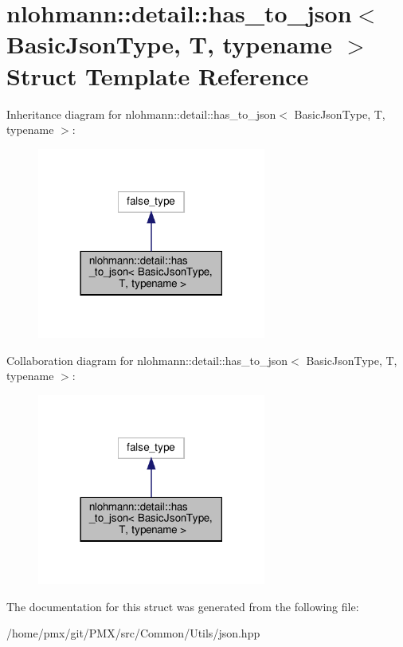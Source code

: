 \hypertarget{structnlohmann_1_1detail_1_1has__to__json}{}\section{nlohmann\+:\+:detail\+:\+:has\+\_\+to\+\_\+json$<$ Basic\+Json\+Type, T, typename $>$ Struct Template Reference}
\label{structnlohmann_1_1detail_1_1has__to__json}


Inheritance diagram for nlohmann\+:\+:detail\+:\+:has\+\_\+to\+\_\+json$<$ Basic\+Json\+Type, T, typename $>$\+:
\nopagebreak
\begin{figure}[H]
\begin{center}
\leavevmode
\includegraphics[width=213pt]{structnlohmann_1_1detail_1_1has__to__json__inherit__graph}
\end{center}
\end{figure}


Collaboration diagram for nlohmann\+:\+:detail\+:\+:has\+\_\+to\+\_\+json$<$ Basic\+Json\+Type, T, typename $>$\+:
\nopagebreak
\begin{figure}[H]
\begin{center}
\leavevmode
\includegraphics[width=213pt]{structnlohmann_1_1detail_1_1has__to__json__coll__graph}
\end{center}
\end{figure}


The documentation for this struct was generated from the following file\+:\begin{DoxyCompactItemize}
\item 
/home/pmx/git/\+P\+M\+X/src/\+Common/\+Utils/json.\+hpp\end{DoxyCompactItemize}
